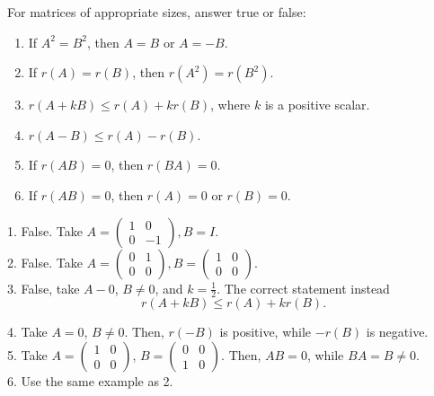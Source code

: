 \begin{exercise}
For matrices of appropriate sizes, answer true or false:
\begin{enumerate}
\item If $A^2 = B^2$, then $A = B$ or $A = -B$.
\item If $r(A) = r(B)$, then $r(A^2) = r(B^2)$.
\item $r(A + kB) \leq r(A) + kr(B)$, where $k$ is a positive scalar.
\item $r(A - B) \leq r(A) - r(B)$.
\item If $r(AB) = 0$, then $r(BA) = 0$.
\item If $r(AB) = 0$, then $r(A) = 0$ or $r(B) = 0$.
\end{enumerate}
\end{exercise}
\begin{solution}
1. False. Take $A = \begin{pmatrix}
    1 & 0 \\ 0 & -1
\end{pmatrix}, B =I$. \\

2. False. Take $A = \begin{pmatrix}
    0 & 1 \\ 0 & 0
\end{pmatrix}, B = \begin{pmatrix}
    1 & 0 \\ 0 & 0
\end{pmatrix}$. \\

3. False, take $A - 0$, $B \neq 0$, and $k = \frac{1}{2}$. The correct statement instead
\[
r(A + kB) \leq r(A) + kr(B).
\]

4. Take $A = 0$, $B \neq 0$. Then, $r(-B)$ is positive, while $-r(B)$ is negative. \\

5. Take $A = \begin{pmatrix}
    1 & 0 \\ 0 & 0
\end{pmatrix}$, $B = \begin{pmatrix}
    0 & 0 \\ 1 & 0
\end{pmatrix}$. Then, $AB = 0$, while $BA = B \neq 0$. \\

6. Use the same example as 2.
\end{solution}

